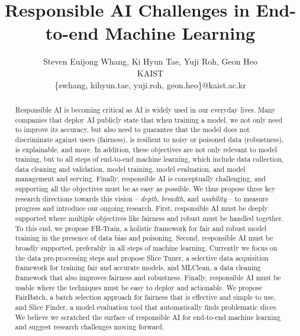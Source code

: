 \documentclass[11pt]{article}
\newcommand{\slicetuner}{Slice Tuner}
\newcommand{\frtrain}{FR-Train}
\newcommand{\fb}{FairBatch}
\newcommand{\mc}{MLClean}
\newcommand{\slicefinder}{Slice Finder}
\begin{document}
\title{Responsible AI Challenges in End-to-end Machine Learning}




\author{Steven Euijong Whang, Ki Hyun Tae, Yuji Roh, Geon Heo \\
KAIST\\
{\small \{swhang, kihyun.tae, yuji.roh, geon.heo\}@kaist.ac.kr}}

\maketitle

\begin{abstract}

Responsible AI is becoming critical as AI is widely used in our everyday lives. Many companies that deploy AI publicly state that when training a model, we not only need to improve its accuracy, but also need to guarantee that the model does not discriminate against users (fairness), is resilient to noisy or poisoned data (robustness), is explainable, and more. In addition, these objectives are not only relevant to model training, but to all steps of end-to-end machine learning, which include data collection, data cleaning and validation, model training, model evaluation, and model management and serving. Finally, responsible AI is conceptually challenging, and supporting all the objectives must be as easy as possible. We thus propose three key research directions towards this vision -- {\em depth}, {\em breadth}, and {\em usability} -- to measure progress and introduce our ongoing research. First, responsible AI must be deeply supported where multiple objectives like fairness and robust must be handled together. To this end, we propose \frtrain{}, a holistic framework for fair and robust model training in the presence of data bias and poisoning. Second, responsible AI must be broadly supported, preferably in all steps of machine learning. Currently we focus on the data pre-processing steps and propose \slicetuner{}, a selective data acquisition framework for training fair and accurate models, and \mc{}, a data cleaning framework that also improves fairness and robustness. Finally, responsible AI must be usable where the techniques must be easy to deploy and actionable. We propose \fb{}, a batch selection approach for fairness that is effective and simple to use, and \slicefinder{}, a model evaluation tool that automatically finds problematic slices. We believe we scratched the surface of responsible AI for end-to-end machine learning and suggest research challenges moving forward.

\end{abstract}
\end{document}
